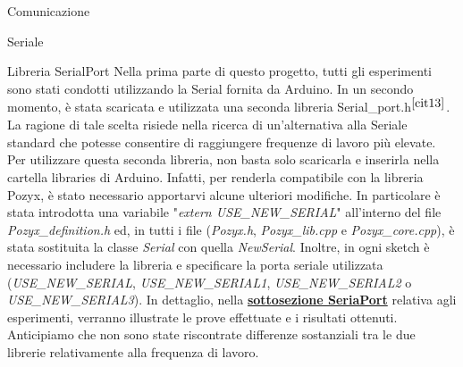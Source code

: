 \documentclass[12pt]{report}
\begin{document}
\begin{section}{Comunicazione}
\begin{subsection}{Seriale}
\begin{subsubsection}{Libreria SerialPort}
			\hypertarget{S2}{Nella} prima parte di questo progetto, tutti gli esperimenti sono stati condotti utilizzando la Serial fornita da Arduino. In un secondo momento, è stata scaricata e utilizzata una seconda libreria Serial\_port.h$^{{\cite{cit13}}}$. 
			La ragione di tale scelta risiede nella ricerca di un’alternativa alla Seriale standard che potesse consentire di raggiungere frequenze di lavoro più elevate.
			Per utilizzare questa seconda libreria, non basta solo scaricarla e inserirla nella cartella libraries di Arduino. Infatti, per renderla compatibile con la libreria Pozyx, è stato necessario apportarvi alcune ulteriori modifiche. In particolare è stata introdotta una variabile "\textit{extern USE\_NEW\_SERIAL}" all'interno 					del file \textit{Pozyx\_definition.h} ed, in tutti i file (\textit{Pozyx.h}, \textit{Pozyx\_lib.cpp} e \textit{Pozyx\_core.cpp}), è stata sostituita la classe \textit{Serial} con quella \textit{NewSerial}. Inoltre, in ogni sketch è necessario includere la libreria e specificare la porta seriale utilizzata 
			(\textit{USE\_NEW\_SERIAL}, \textit{USE\_NEW\_SERIAL1}, \textit{USE\_NEW\_SERIAL2} o \textit{USE\_NEW\_SERIAL3}).
			In dettaglio, nella \hyperlink{SS2}{\textbf{sottosezione SeriaPort}} relativa agli esperimenti, verranno illustrate le prove effettuate e i risultati ottenuti. Anticipiamo che non sono state riscontrate differenze sostanziali tra le due librerie relativamente alla frequenza di lavoro.
		 \end{subsubsection}

		\end{subsection}

	\end{section}
	\newpage
\end{document}
